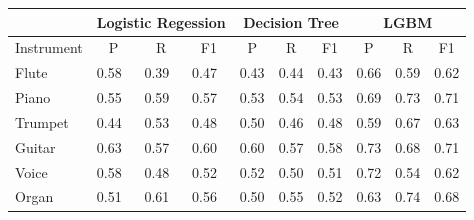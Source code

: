 \documentclass{article}
\begin{document}
\begin{itemize}
		
	\begin{center}
		\begin{table}[h!]
			\begin{tabular}{@{}l|lll|lll|lll@{}}
				\toprule
				& \multicolumn{3}{c}{\textbf{Logistic Regession}}                        & \multicolumn{3}{c}{\textbf{Decision Tree}}                             & \multicolumn{3}{c}{\textbf{LGBM}}                                      \\ \midrule
				Instrument & \multicolumn{1}{c}{P} & \multicolumn{1}{c}{R} & \multicolumn{1}{c}{F1} & \multicolumn{1}{c}{P} & \multicolumn{1}{c}{R} & \multicolumn{1}{c}{F1} & \multicolumn{1}{c}{P} & \multicolumn{1}{c}{R} & \multicolumn{1}{c}{F1}\\ 
				Flute      & 0.58                  & 0.39                  & 0.47                   & 0.43                  & 0.44                  & 0.43                   & 0.66                  & 0.59                  & 0.62                   \\
				Piano      & 0.55                  & 0.59                  & 0.57                   & 0.53                  & 0.54                  & 0.53                   & 0.69                  & 0.73                  & 0.71                   \\
				Trumpet    & 0.44                  & 0.53                  & 0.48                   & 0.50                  & 0.46                  & 0.48                   & 0.59                  & 0.67                  & 0.63                   \\
				Guitar     & 0.63                  & 0.57                  & 0.60                   & 0.60                  & 0.57                  & 0.58                   & 0.73                  & 0.68                  & 0.71                   \\
				Voice      & 0.58                  & 0.48                  & 0.52                   & 0.52                  & 0.50                  & 0.51                   & 0.72                  & 0.54                  & 0.62                   \\
				Organ      & 0.51                  & 0.61                  & 0.56                   & 0.50                  & 0.55                  & 0.52                   & 0.63                  & 0.74                  & 0.68                   \\ 
			\end{tabular}
			

\end{table}
\end{center}
\end{itemize}
\end{document}
